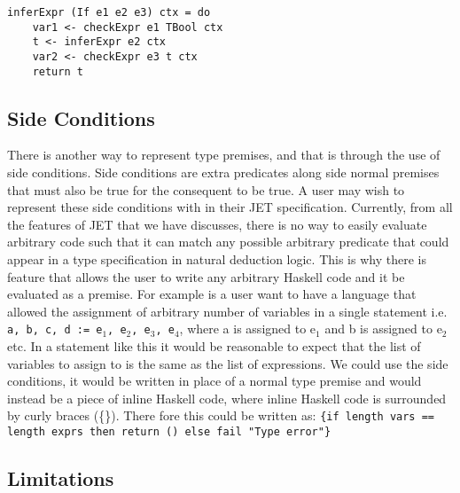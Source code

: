 \begin{lstlisting}[caption = Code generated for inferExpr from TExprIf, label=lst:codeTExprIfInfer]
inferExpr (If e1 e2 e3) ctx = do
    var1 <- checkExpr e1 TBool ctx
    t <- inferExpr e2 ctx
    var2 <- checkExpr e3 t ctx
    return t
\end{lstlisting}

\subsection{Side Conditions}
There is another way to represent type premises, and that is through the use of side conditions.
Side conditions are extra predicates along side normal premises that must also be true for the consequent to be true.
A user may wish to represent these side conditions with in their JET specification.
Currently, from all the features of JET that we have discusses, there is no way to easily evaluate arbitrary code such that it can match any possible arbitrary predicate that could appear in a type specification in natural deduction logic.
This is why there is feature that allows the user to write any arbitrary Haskell code and it be evaluated as a premise.
For example is a user want to have a language that allowed the assignment of arbitrary number of variables in a single statement i.e. \texttt{a, b, c, d := e$_1$, e$_2$, e$_3$, e$_4$}, where a is assigned to e$_1$ and b is assigned to e$_2$ etc.
In a statement like this it would be reasonable to expect that the list of variables to assign to is the same as the list of expressions.
We could use the side conditions, it would be written in place of a normal type premise and would instead be a piece of inline Haskell code, where inline Haskell code is surrounded by curly braces (\{\}).
There fore this could be written as: \texttt{\{if length vars == length exprs then return () else fail "Type error"\}}

\subsection{Limitations}